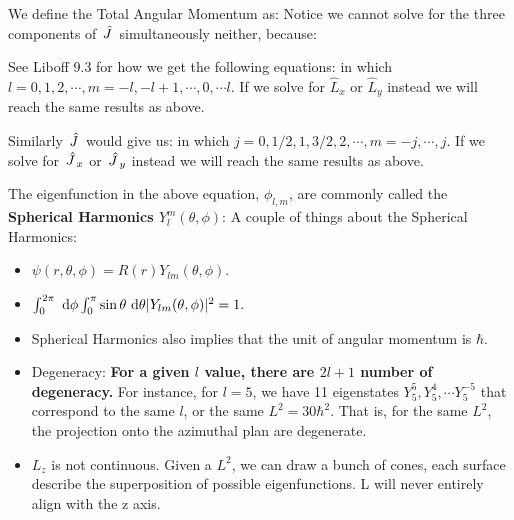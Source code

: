 \documentclass{school-22.101-notes}
\begin{document}
We define the Total Angular Momentum as:
\eqn{ \Jhat = \Lhat + \Shat }
Notice we cannot solve for the three components of $\left. \hat{J} \right.$ simultaneously neither, because: 


See Liboff 9.3 for how we get the following equations: 
in which $l = 0,1,2, \cdots, m = -l, -l+1, \cdots, 0, \cdots l$. If we solve for $\hat{L}_x$ or $\hat{L}_y$ instead we will reach the same results as above. 

Similarly $\left. \hat{J} \right.$ would give us:
in which $j = 0,1/2,1,3/2,2, \cdots, m = -j, \cdots, j$. If we solve for $\left. \hat{J} \right._x$ or $\left. \hat{J} \right._y$ instead we will reach the same results as above. 

The eigenfunction in the above equation, $\phi_{l,m}$, are commonly called the \textbf{Spherical Harmonics $Y_l^m (\theta, \phi)$}:
A couple of things about the Spherical Harmonics:
\begin{itemize}
\item $\psi( r, \theta, \phi) = R(r) Y_{lm} (\theta, \phi)$. 
\item $\int_0^{2\pi} \mbox{ }\mathrm{d} \phi \int_0^{\pi} \sin \theta \mbox{ }\mathrm{d} \theta |Y_{lm} (\theta, \phi) |^2 = 1.$
\item Spherical Harmonics also implies that the unit of angular momentum is $\hbar$.
\item Degeneracy: \textbf{For a given $l$ value, there are $2l+1$ number of degeneracy.} For instance, for $l=5$, we have 11 eigenstates $Y_5^5, Y_5^4, \cdots Y_5^{-5}$ that correspond to the same $l$, or the same $L^2 = 30 \hbar^2$. That is, for the same $L^2$, the projection onto the azimuthal plan are degenerate.  
\item $L_z$ is not continuous. Given a $L^2$, we can draw a bunch of cones, each surface describe the superposition of possible eigenfunctions. L will never entirely align with the z axis. 
\end{itemize}
\end{document}
